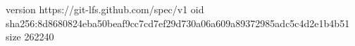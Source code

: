 version https://git-lfs.github.com/spec/v1
oid sha256:8d8680824eba50beaf9cc7cd7ef29d730a06a609a89372985adc5c4d2e1b4b51
size 262240
